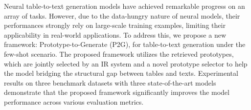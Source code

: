 Neural table-to-text generation models have achieved remarkable progress on an array of tasks. However, due to the data-hungry nature of neural models, their performances strongly rely on large-scale training examples, limiting their applicability in real-world applications. To address this, we propose a new framework: Prototype-to-Generate (P2G), for table-to-text generation under the few-shot scenario. The proposed framework utilizes the retrieved prototypes, which are jointly selected by an IR system and a novel prototype selector to help the model bridging the structural gap between tables and texts. Experimental results on three benchmark datasets with three state-of-the-art models demonstrate that the proposed framework significantly improves the model performance across various evaluation metrics.
